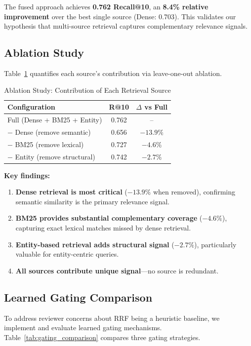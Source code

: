 \documentclass[11pt,a4paper]{article}
\begin{document}
The fused approach achieves \textbf{0.762 Recall@10}, an \textbf{8.4\% relative improvement} over the best single source (Dense: 0.703). This validates our hypothesis that multi-source retrieval captures complementary relevance signals.

\subsection{Ablation Study}

Table~\ref{tab:ablation} quantifies each source's contribution via leave-one-out ablation.

\begin{table}[h]
\centering
\caption{Ablation Study: Contribution of Each Retrieval Source}
\label{tab:ablation}
\begin{tabular}{lcc}
\toprule
\textbf{Configuration} & \textbf{R@10} & \textbf{$\Delta$ vs Full} \\
\midrule
Full (Dense + BM25 + Entity) & 0.762 & -- \\
\midrule
$-$ Dense (remove semantic) & 0.656 & $-13.9\%$ \\
$-$ BM25 (remove lexical) & 0.727 & $-4.6\%$ \\
$-$ Entity (remove structural) & 0.742 & $-2.7\%$ \\
\bottomrule
\end{tabular}
\end{table}

\textbf{Key findings:}
\begin{enumerate}
    \item \textbf{Dense retrieval is most critical} ($-13.9\%$ when removed), confirming semantic similarity is the primary relevance signal.
    \item \textbf{BM25 provides substantial complementary coverage} ($-4.6\%$), capturing exact lexical matches missed by dense retrieval.
    \item \textbf{Entity-based retrieval adds structural signal} ($-2.7\%$), particularly valuable for entity-centric queries.
    \item \textbf{All sources contribute unique signal}---no source is redundant.
\end{enumerate}

\subsection{Learned Gating Comparison}

To address reviewer concerns about RRF being a heuristic baseline, we implement and evaluate learned gating mechanisms. Table~\ref{tab:gating_comparison} compares three gating strategies.
\end{document}
